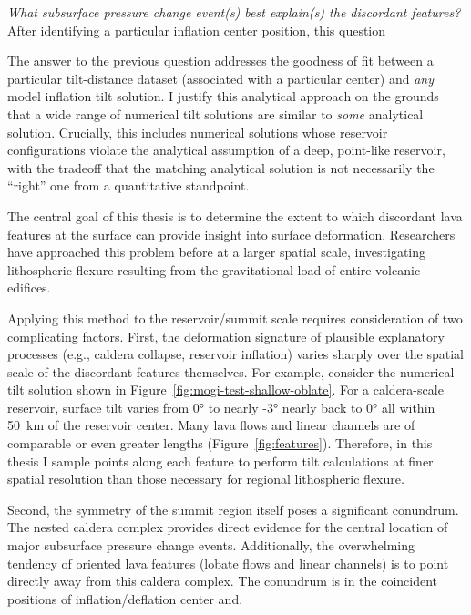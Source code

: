 \emph{What subsurface pressure change event(s) best explain(s) the discordant features?} After identifying a particular inflation center position, this question 

The answer to the previous question addresses the goodness of fit between a particular tilt-distance dataset (associated with a particular center) and \emph{any} model inflation tilt solution. I justify this analytical approach on the grounds that a wide range of numerical tilt solutions are similar to \emph{some} analytical solution. Crucially, this includes numerical solutions whose reservoir configurations violate the analytical assumption of a deep, point-like reservoir, with the tradeoff that the matching analytical solution is not necessarily the ``right'' one from a quantitative standpoint.

The central goal of this thesis is to determine the extent to which discordant lava features at the surface can provide insight into surface deformation. Researchers have approached this problem before \parencite{mouginis-mark_ancient_1982,isherwood_volcanic_2013,chadwick_late_2015} at a larger spatial scale, investigating lithospheric flexure resulting from the gravitational load of entire volcanic edifices.

Applying this method to the reservoir/summit scale requires consideration of two complicating factors. First, the deformation signature of plausible explanatory processes (e.g., caldera collapse, reservoir inflation) varies sharply over the spatial scale of the discordant features themselves. For example, consider the numerical tilt solution shown in Figure~\ref{fig:mogi-test-shallow-oblate}. For a caldera-scale reservoir, surface tilt varies from \ang{0} to nearly \ang{-3} nearly back to \ang{0} all within \qty{50}{\km} of the reservoir center. Many lava flows and linear channels are of comparable or even greater lengths (Figure~\ref{fig:features}). Therefore, in this thesis I sample points along each feature to perform tilt calculations at finer spatial resolution than those necessary for regional lithospheric flexure.

Second, the symmetry of the summit region itself poses a significant conundrum. The nested caldera complex provides direct evidence for the central location of major subsurface pressure change events. Additionally, the overwhelming tendency of oriented lava features (lobate flows and linear channels) is to point directly away from this caldera complex. The conundrum is in the coincident positions of inflation/deflation center and.


